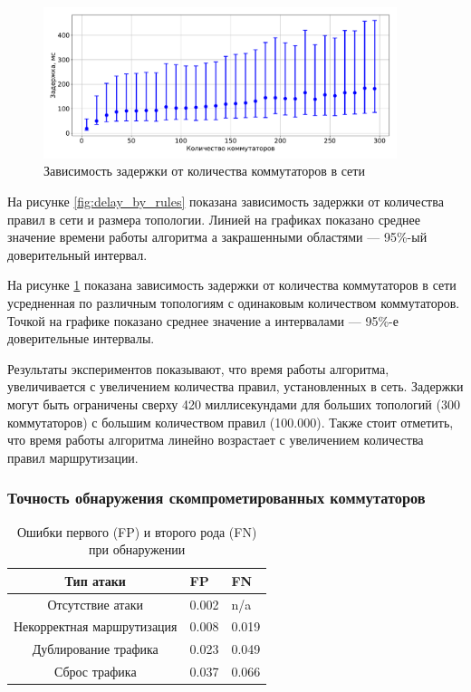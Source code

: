 \documentclass[../thesis.tex]{subfiles}
\begin{document}
\begin{figure}
\centering
\includegraphics[width=0.92\textwidth]{figures/experiments/delay_by_switches.pdf}
\caption{Зависимость задержки от количества коммутаторов в сети} \label{fig:delay_by_switches}
\end{figure}

На рисунке \ref{fig:delay_by_rules} показана зависимость задержки от количества правил в сети и размера топологии.
Линией на графиках показано среднее значение времени работы алгоритма а закрашенными областями --- 95\%-ый доверительный интервал.

На рисунке \ref{fig:delay_by_switches} показана зависимость задержки от количества коммутаторов в сети усредненная по различным топологиям с одинаковым количеством коммутаторов.
Точкой на графике показано среднее значение а интервалами --- 95\%-е доверительные интервалы.

Результаты экспериментов показывают, что время работы алгоритма, увеличивается с увеличением количества правил, установленных в сеть.
Задержки могут быть ограничены сверху 420 миллисекундами для больших топологий (300 коммутаторов) с большим количеством правил (100.000).
Также стоит отметить, что время работы алгоритма линейно возрастает с увеличением количества правил маршрутизации.

\subsubsection{Точность обнаружения скомпрометированных коммутаторов}

{

\begin{table}[htbp]
\centering
\begin{tabularx}{\textwidth}{|c|Y|Y|}
  \hline
  \textbf{Тип атаки} & \textbf{FP} & \textbf{FN} \\ \hline
  Отсутствие атаки & 0.002 & n/a \\ \hline
  Некорректная маршрутизация & 0.008 & 0.019 \\ \hline
  Дублирование трафика & 0.023 & 0.049 \\ \hline
  Сброс трафика & 0.037 & 0.066 \\ \hline
\end{tabularx}
\caption{Ошибки первого (FP) и второго рода (FN) при обнаружении} \label{table:detection}
\end{table}
}
\end{document}
